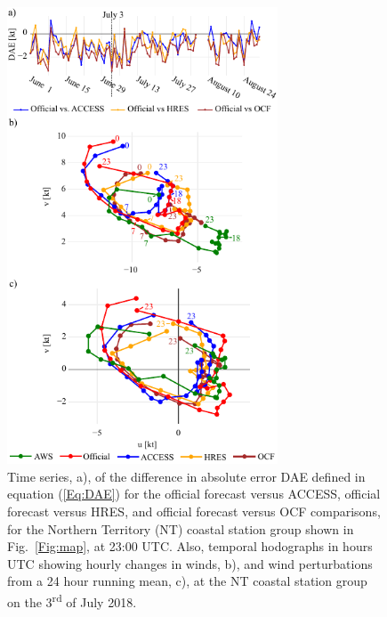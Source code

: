 \documentclass{ametsoc}
\begin{document}
\begin{figure}
\centering
\includegraphics[width=19pc]{case_studies_nt.pdf}
\caption{Time series, a), of the difference in absolute error DAE defined in equation (\ref{Eq:DAE}) for the official forecast versus ACCESS, official forecast versus HRES, and official forecast versus OCF comparisons, for the Northern Territory (NT) coastal station group shown in Fig.~\ref{Fig:map}, at 23:00 UTC. Also, temporal hodographs in hours UTC showing hourly changes in winds, b), and wind perturbations from a 24 hour running mean, c), at the NT coastal station group on the 3\textsuperscript{rd} of July 2018.}
\label{Fig:case_studies_nt}
\end{figure}
\end{document}
